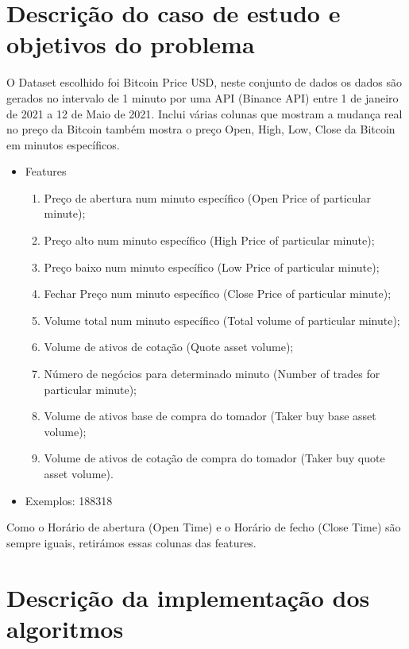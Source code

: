 \documentclass[10pt]{article}
\begin{document}
\vspace{4cm}
\section{Descrição do caso de estudo e objetivos do problema}\label{sec:apre-da-org}
O Dataset escolhido foi Bitcoin Price USD, neste conjunto de dados os dados são gerados no intervalo 
de 1 minuto por uma API (Binance API) entre 1 de janeiro de 2021 a 12 de Maio de 2021.
Inclui várias colunas que mostram a mudança real no preço da Bitcoin também mostra o preço Open, High,
Low, Close da Bitcoin em minutos específicos. 
\begin{itemize}
    \item{Features}
    \begin{enumerate}
        \item Preço de abertura num minuto específico (Open Price of particular minute);
        \item Preço alto num minuto específico (High Price of particular minute);
        \item Preço baixo num minuto específico (Low Price of particular minute);
        \item Fechar Preço num minuto específico (Close Price of particular minute);
        \item Volume total num minuto específico (Total volume of particular minute);
        \item Volume de ativos de cotação (Quote asset volume);
        \item Número de negócios para determinado minuto (Number of trades for particular minute);
        \item Volume de ativos base de compra do tomador (Taker buy base asset volume);
        \item Volume de ativos de cotação de compra do tomador (Taker buy quote asset volume).
    \end{enumerate}
\end{itemize}
\begin{itemize}
    \item{Exemplos: 188318}
\end{itemize}   
Como o Horário de abertura (Open Time) e o Horário de fecho (Close Time) são sempre iguais, retirámos essas colunas das features.
\newpage
\section{Descrição da implementação dos algoritmos}\label{sec:Des-da-imp-dos-alg}
\end{document}
